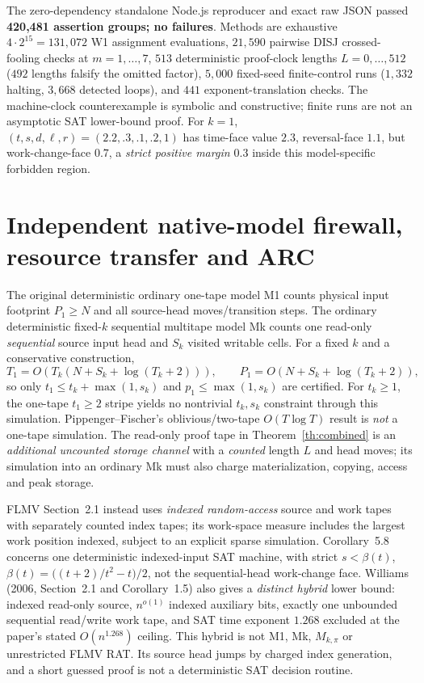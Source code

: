 \documentclass[11pt]{article}
\begin{document}
The zero-dependency standalone Node.js reproducer
and exact raw JSON
passed \textbf{420,481 assertion groups; no failures}.
Methods are exhaustive $4\cdot2^{15}=131{,}072$ W1
assignment evaluations, $21{,}590$ pairwise DISJ crossed-fooling
checks at $m=1,\ldots,7$, $513$ deterministic proof-clock lengths
$L=0,\ldots,512$ ($492$ lengths falsify the omitted factor),
$5{,}000$ fixed-seed finite-control runs
($1{,}332$ halting, $3{,}668$ detected loops),
and $441$ exponent-translation checks.
The machine-clock counterexample is symbolic and constructive;
finite runs are not an asymptotic SAT lower-bound proof.
For $k=1$, $(t,s,d,\ell,r)=(2.2,.3,.1,.2,1)$ has
time-face value $2.3$, reversal-face $1.1$, but
work-change-face $0.7$, a \emph{strict positive margin $0.3$}
inside this model-specific forbidden region.

\section{Independent native-model firewall, resource transfer and ARC}
The original deterministic ordinary one-tape model M1 counts
physical input footprint $P_1\ge N$ and all source-head
moves/transition steps. The ordinary deterministic fixed-$k$
sequential multitape model Mk counts one read-only
\emph{sequential} source input head and $S_k$ visited
writable cells. For a fixed $k$ and a conservative construction,
\[
 T_1=O(T_k(N+S_k+\log(T_k+2))),\qquad
 P_1=O(N+S_k+\log(T_k+2)),
\]
so only $t_1\le t_k+\max(1,s_k)$ and
$p_1\le\max(1,s_k)$ are certified.
For $t_k\ge1$, the one-tape $t_1\ge2$ stripe
yields no nontrivial $t_k,s_k$ constraint through this
simulation. Pippenger--Fischer's oblivious/two-tape
$O(T\log T)$ result is \emph{not} a one-tape simulation.
The read-only proof tape in Theorem~\ref{th:combined}
is an \emph{additional uncounted storage channel} with
a \emph{counted} length $L$ and head moves; its simulation
into an ordinary Mk must also charge materialization,
copying, access and peak storage.

FLMV Section~2.1 instead uses \emph{indexed random-access}
source and work tapes with separately counted index tapes;
its work-space measure includes the largest work position
indexed, subject to an explicit sparse simulation.
Corollary~5.8 concerns one deterministic indexed-input
SAT machine, with strict $s<\beta(t)$,
$\beta(t)=\bigl((t+2)/t^2-t\bigr)/2$, not the
sequential-head work-change face.
Williams (2006, Section~2.1 and Corollary~1.5)
also gives a \emph{distinct hybrid} lower bound:
indexed read-only source, $n^{o(1)}$ indexed
auxiliary bits, exactly one unbounded sequential
read/write work tape, and SAT time exponent
$1.268$ excluded at the paper's stated $O(n^{1.268})$
ceiling. This hybrid is not M1, Mk, $M_{k,\pi}$
or unrestricted FLMV RAT. Its source head jumps by
charged index generation, and a short guessed proof
is not a deterministic SAT decision routine.
\end{document}
